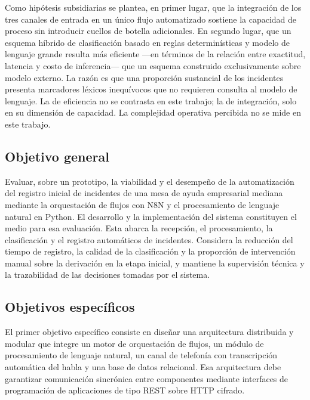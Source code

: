 Como hipótesis subsidiarias se plantea, en primer lugar, que la integración de los tres canales de entrada en un único flujo automatizado sostiene la capacidad de proceso sin introducir cuellos de botella adicionales. En segundo lugar, que un esquema híbrido de clasificación basado en reglas determinísticas y modelo de lenguaje grande resulta más eficiente ---en términos de la relación entre exactitud, latencia y costo de inferencia--- que un esquema construido exclusivamente sobre modelo externo. La razón es que una proporción sustancial de los incidentes presenta marcadores léxicos inequívocos que no requieren consulta al modelo de lenguaje. La de eficiencia no se contrasta en este trabajo; la de integración, solo en su dimensión de capacidad. La complejidad operativa percibida no se mide en este trabajo.

\subsection{Objetivo general}\label{subsec:objetivo-general}

Evaluar, sobre un prototipo, la viabilidad y el desempeño de la automatización del registro inicial de incidentes de una mesa de ayuda empresarial mediana mediante la orquestación de flujos con N8N y el procesamiento de lenguaje natural en Python. El desarrollo y la implementación del sistema constituyen el medio para esa evaluación. Esta abarca la recepción, el procesamiento, la clasificación y el registro automáticos de incidentes. Considera la reducción del tiempo de registro, la calidad de la clasificación y la proporción de intervención manual sobre la derivación en la etapa inicial, y mantiene la supervisión técnica y la trazabilidad de las decisiones tomadas por el sistema.

\subsection{Objetivos específicos}\label{subsec:objetivos-especificos}

El primer objetivo específico consiste en diseñar una arquitectura distribuida y modular que integre un motor de orquestación de flujos, un módulo de procesamiento de lenguaje natural, un canal de telefonía con transcripción automática del habla y una base de datos relacional. Esa arquitectura debe garantizar comunicación sincrónica entre componentes mediante interfaces de programación de aplicaciones de tipo REST sobre HTTP cifrado.

